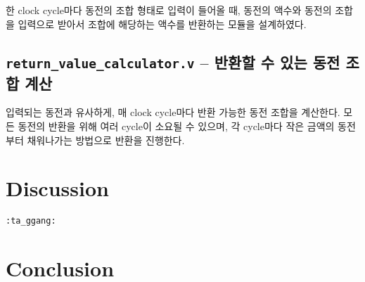 \documentclass{scrartcl}
\begin{document}
한 clock cycle마다 동전의 조합 형태로 입력이 들어올 때, 동전의 액수와 동전의 조합을 입력으로 받아서
조합에 해당하는 액수를 반환하는 모듈을 설계하였다.

\subsection{\texttt{return\_value\_calculator.v} -- 반환할 수 있는 동전 조합 계산}

입력되는 동전과 유사하게, 매 clock cycle마다 반환 가능한 동전 조합을 계산한다.
모든 동전의 반환을 위해 여러 cycle이 소요될 수 있으며, 각 cycle마다 작은 금액의 동전부터 채워나가는 방법으로
반환을 진행한다.

\section{Discussion}
\texttt{:ta\_ggang:} %

\section{Conclusion}
\end{document}
